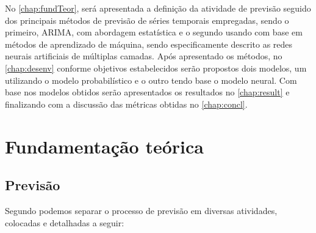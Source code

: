 \documentclass[
	12pt,
	oneside,
	a4paper,
	english,
	brazil
]{abntex2}
\begin{document}
No \autoref{chap:fundTeor}, será apresentada a definição da atividade de 
previsão seguido dos principais métodos de previsão de séries temporais 
empregadas, sendo o primeiro, ARIMA, com abordagem estatística e o segundo 
usando com base em métodos de aprendizado de máquina, sendo especificamente 
descrito as redes neurais artificiais de múltiplas camadas. Após apresentado os 
métodos, no \autoref{chap:desenv} conforme objetivos estabelecidos serão 
propostos dois modelos, um utilizando o modelo probabilístico e o outro tendo 
base o modelo neural. Com base nos modelos obtidos serão apresentados os 
resultados no \autoref{chap:result} e finalizando com a discussão das métricas 
obtidas no \autoref{chap:concl}.

\chapter{Fundamentação teórica}\label{chap:fundTeor}

\section{Previsão}
Segundo  podemos separar o processo de previsão em diversas 
atividades, colocadas e detalhadas a seguir:
\end{document}
